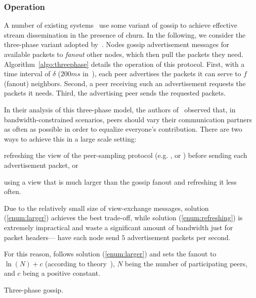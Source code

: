 \subsubsection{Operation}
A number of existing
systems~\cite{Frey09Middleware,monod:THESIS,Zhang07Understanding} use
some variant of gossip to achieve effective stream dissemination in
the presence of churn. In the following, we consider the three-phase
variant adopted
by~\cite{Frey09DSN,FlightPath,monod:THESIS,Zhang07Understanding}. Nodes
gossip advertisement messages for available packets to \emph{fanout}
other nodes, which then pull the packets they need.
Algorithm~\ref{algo:threephase} details the operation of this protocol.
First, with a time interval of $\delta$ ($200ms$
in~\cite{Frey09DSN,Frey09Middleware}), each peer advertises the packets
it can serve to $f$ (fanout) neighbors. Second, a peer receiving such
an advertisement requests the packets it needs. Third, the advertising
peer sends the requested packets.

In their analysis of this three-phase model, the authors
of~\cite{Frey09DSN} observed that, in bandwidth-constrained scenarios,
peers should vary their communication partners as often as possible in
order to equalize everyone's contribution. There are two ways to
achieve this in a large scale setting:
\begin{inparaenum}[(i)]
\item \label{enum:refreshing} refreshing the view of the peer-sampling protocol
  (e.g. \CYCLON, or \SPRAY) before sending each advertisement packet, or
\item \label{enum:larger} using a view that is much larger than the gossip
  fanout and refreshing it less often.
\end{inparaenum}
Due to the relatively small size of view-exchange messages, solution
(\ref{enum:larger}) achieves the best trade-off, while solution
(\ref{enum:refreshing}) is extremely impractical and waste a significant
amount of bandwidth just for packet headers---\cite{Frey09DSN,Frey09Middleware}
have each node send $5$ advertisement packets per second.

For this reason, \cite{frey:hal-01479885} follows solution (\ref{enum:larger})
and sets the fanout to $\ln(N)+c$ (according to theory~\cite{PRD}), $N$ being the
number of participating peers, and $c$ being a positive constant.

\begin{algorithm*}[h]
  
  \caption{\label{algo:threephase}Three-phase gossip.}
\end{algorithm*}



